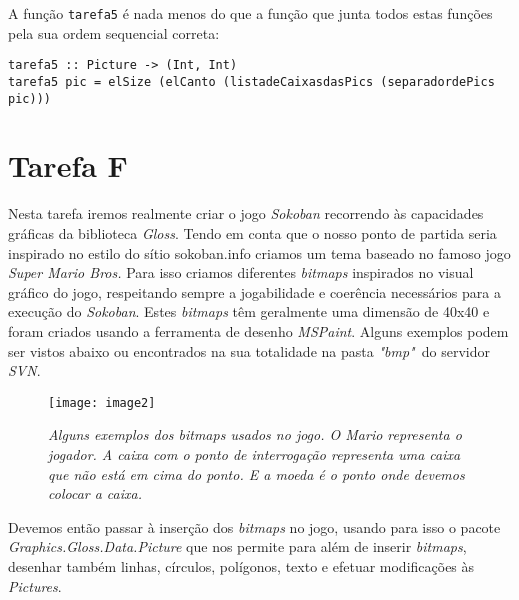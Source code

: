 \documentclass[a4paper,12pt]{report}
\begin{document}
A função {\footnotesize\tt tarefa5} é nada menos do que a função que junta todos estas funções pela sua ordem sequencial correta:
\\
\begin{lstlisting}[caption={\small\sl Função {\footnotesize\tt tarefa5} que dada uma Picture que pode, ou não ser um conjunto de Pictures devolve o retângulo de menores dimensões que envolve essa Picture.}]
tarefa5 :: Picture -> (Int, Int)
tarefa5 pic = elSize (elCanto (listadeCaixasdasPics (separadordePics pic)))
\end{lstlisting}




\pagebreak













\section{Tarefa F}
Nesta tarefa iremos realmente criar o jogo {\sl Sokoban} recorrendo às capacidades gráficas da biblioteca {\sl Gloss}. Tendo em conta que o nosso ponto de partida seria inspirado no estilo do sítio {\sf sokoban.info} criamos um tema baseado no famoso jogo {\sl Super Mario Bros.} Para isso criamos diferentes {\it bitmaps} inspirados no visual gráfico do jogo, respeitando sempre a jogabilidade e coerência necessários para a execução do {\sl Sokoban}. Estes {\it bitmaps} têm geralmente uma dimensão de 40x40 e foram criados usando a ferramenta de desenho {\sl MSPaint}. Alguns exemplos podem ser vistos abaixo ou encontrados na sua totalidade na pasta {\sl "bmp" }do servidor {\sl SVN}.
\begin{figure}[h]
	\centering
	\texttt{[image: image2]}
	\caption{\small\sl Alguns exemplos dos bitmaps usados no jogo. O Mario representa o jogador. A caixa com o ponto de interrogação representa uma caixa que não está em cima do ponto. E a moeda é o ponto onde devemos colocar a caixa.}
	\captionsetup[figure]{list=yes}
\end{figure}

Devemos então passar à inserção dos {\it bitmaps} no jogo, usando para isso o pacote {\it Graphics.Gloss.Data.Picture} que nos permite para além de inserir {\it bitmaps}, desenhar também linhas, círculos, polígonos, texto e efetuar modificações às {\sl Pictures}.
\\
\end{document}
